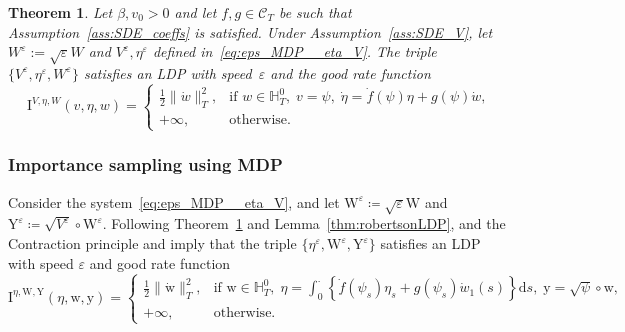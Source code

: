\documentclass{amsart}[11pt]
\numberwithin{equation}{section}
\newtheorem{theorem}{Theorem}%
\numberwithin{theorem}{subsection}
\numberwithin{proposition}{subsection}
\numberwithin{definition}{subsection}
\numberwithin{lemma}{subsection}
\newtheorem*{remark}{Remark}
\numberwithin{assumption}{subsection}
\newcommand{\Cc}{\mathcal{C}}
\newcommand{\HH}{\mathbb{H}}
\newcommand{\Wf}{\boldsymbol{\mathrm{W}}}
\newcommand{\Yf}{\boldsymbol{\mathrm{Y}}}
\newcommand{\D}{\mathrm{d}}
\newcommand{\II}{\mathrm{I}}
\newcommand{\eps}{\varepsilon}
\newcommand{\ww}{\boldsymbol{\mathrm{w}}}
\newcommand{\yy}{\boldsymbol{\mathrm{y}}}
\begin{document}
\begin{theorem}\label{thm:mdp-small-noise}
Let $\beta, v_0>0$ and let $f, g \in \Cc_T$ be such that Assumption~\ref{ass:SDE_coeffs} is satisfied.
Under Assumption~\ref{ass:SDE_V}, 
let $W^{\eps} := \sqrt{\eps}W$ and $V^\eps, \eta^{\eps}$ defined in~\eqref{eq:eps_MDP__eta_V}.
The triple
$\{V^\eps, \eta^\eps,W^\eps\}$ satisfies an LDP with speed~$\eps$ and the good rate function
\begin{equation*}
\II^{V,\eta,W}(v,\eta,w) = 
\left\{
\begin{array}{ll}
\displaystyle \frac{1}{2}\|\dot{w}\|_{T}^2, & \text{if }
\displaystyle 
w \in \HH_T^0,\;
v = \psi,\;
\dot{\eta} = \dot{f}(\psi)\eta + g(\psi)\dot{w},\\
+\infty, & \text{otherwise}.
\end{array}
\right.
\end{equation*}
\end{theorem}


\subsubsection{Importance sampling using MDP}
Consider the system~\eqref{eq:eps_MDP__eta_V}, 
and let $\Wf^\eps \coloneqq \sqrt{\eps}\Wf$ and $\Yf^\eps \coloneqq \sqrt{V^\eps}\circ \Wf^\eps$. 
Following Theorem~\ref{thm:mdp-small-noise} and Lemma~\ref{thm:robertsonLDP}, and the Contraction principle and \cite[Exercise 4.2.7]{Dembo2010} imply that the triple $\{\eta^\eps,\Wf^\eps, \Yf^\eps\}$ satisfies an LDP with speed $\eps$ and good rate function 
\begin{equation*}
\II^{\eta,\Wf,\Yf}(\eta,\ww, \yy) =
\left\{
\begin{array}{ll}
\displaystyle 
\frac{1}{2}\|\dot{\ww}\|_{T}^2, & \text{if }
\displaystyle 
\ww \in \HH_T^0,\;
\eta = \int_{0}^{\cdot}\left\{\dot{f}(\psi_s)\eta_s + g(\psi_s)\dot{w}_1(s)\right\}\D s,\;
\yy = \sqrt{\psi}\circ \ww,\\
+\infty, & \text{otherwise}.
\end{array}
\right.
\end{equation*}


\end{document}
